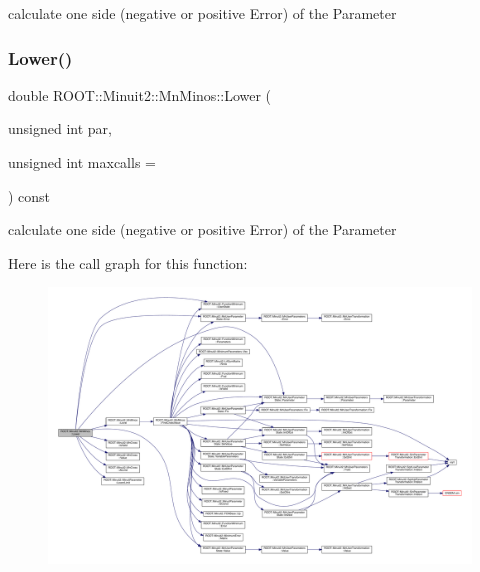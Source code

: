 calculate one side (negative or positive Error) of the Parameter 

\mbox{\label{classROOT_1_1Minuit2_1_1MnMinos_a0e6c6ab67bdd7b3461d900f64b4908ba}} 
\subsubsection{\texorpdfstring{Lower()}{Lower()}\hspace{0.1cm}{\footnotesize\ttfamily [2/2]}}
{\footnotesize\ttfamily double R\+O\+O\+T\+::\+Minuit2\+::\+Mn\+Minos\+::\+Lower (\begin{DoxyParamCaption}\item[{unsigned int}]{par,  }\item[{unsigned int}]{maxcalls = {} }\end{DoxyParamCaption}) const}



calculate one side (negative or positive Error) of the Parameter 

Here is the call graph for this function\+:\nopagebreak
\begin{figure}[H]
\begin{center}
\leavevmode
\includegraphics[width=350pt]{dc/d91/classROOT_1_1Minuit2_1_1MnMinos_a0e6c6ab67bdd7b3461d900f64b4908ba_cgraph}
\end{center}
\end{figure}
\mbox{\label{classROOT_1_1Minuit2_1_1MnMinos_aeb1fe39f5851b5af050191d812d21723}} 
